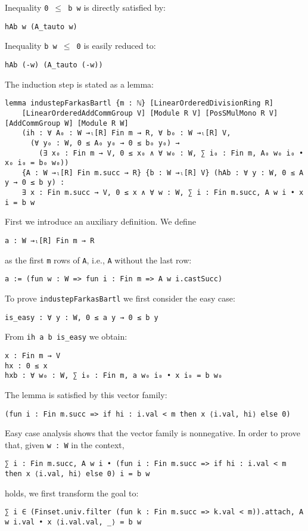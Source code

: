 \documentclass[]{article}
\renewcommand{\.}{\hskip .75pt}
\begin{document}
Inequality \texttt{0 $\le$ b w} is directly satisfied by:
\begin{lstlisting}
hAb w (A_tauto w)
\end{lstlisting}
Inequality \texttt{b w $\le$ 0} is easily reduced to:
\begin{lstlisting}
hAb (-w) (A_tauto (-w))
\end{lstlisting}
The induction step is stated as a lemma:
\begin{lstlisting}
lemma industepFarkasBartl {m : ℕ} [LinearOrderedDivisionRing R]
    [LinearOrderedAddCommGroup V] [Module R V] [PosSMulMono R V] [AddCommGroup W] [Module R W]
    (ih : ∀ A₀ : W →ₗ[R] Fin m → R, ∀ b₀ : W →ₗ[R] V,
      (∀ y₀ : W, 0 ≤ A₀ y₀ → 0 ≤ b₀ y₀) →
        (∃ x₀ : Fin m → V, 0 ≤ x₀ ∧ ∀ w₀ : W, ∑ i₀ : Fin m, A₀ w₀ i₀ • x₀ i₀ = b₀ w₀))
    {A : W →ₗ[R] Fin m.succ → R} {b : W →ₗ[R] V} (hAb : ∀ y : W, 0 ≤ A y → 0 ≤ b y) :
    ∃ x : Fin m.succ → V, 0 ≤ x ∧ ∀ w : W, ∑ i : Fin m.succ, A w i • x i = b w
\end{lstlisting}
First we introduce an auxiliary definition. We define
\begin{lstlisting}
a : W →ₗ[R] Fin m → R
\end{lstlisting}
as the first \texttt{m} rows of \texttt{A}, i.e., \texttt{A} without the last row:
\begin{lstlisting}
a := (fun w : W => fun i : Fin m => A w i.castSucc)
\end{lstlisting}
To prove \texttt{industepFarkasBartl} we first consider the easy case:
\begin{lstlisting}
is_easy : ∀ y : W, 0 ≤ a y → 0 ≤ b y
\end{lstlisting}
From \texttt{ih a b is\_easy} we obtain:
\begin{lstlisting}
x : Fin m → V
hx : 0 ≤ x
hxb : ∀ w₀ : W, ∑ i₀ : Fin m, a w₀ i₀ • x i₀ = b w₀
\end{lstlisting}
The lemma is satisfied by this vector family:
\begin{lstlisting}
(fun i : Fin m.succ => if hi : i.val < m then x ⟨i.val, hi⟩ else 0)
\end{lstlisting}
Easy case analysis shows that the vector family is nonnegative. In order to prove that, given \texttt{w :~W} in the context,
\begin{lstlisting}
∑ i : Fin m.succ, A w i • (fun i : Fin m.succ => if hi : i.val < m then x ⟨i.val, hi⟩ else 0) i = b w
\end{lstlisting}
holds, we first transform the goal to:
\begin{lstlisting}
∑ i ∈ (Finset.univ.filter (fun k : Fin m.succ => k.val < m)).attach, A w i.val • x ⟨i.val.val, _⟩ = b w
\end{lstlisting}
\end{document}
